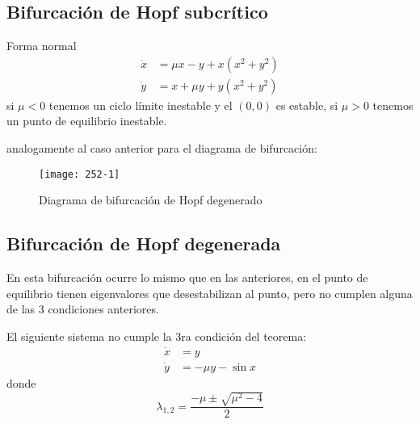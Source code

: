 \subsection{Bifurcación de Hopf subcrítico}
Forma normal
\begin{align*}
  \dot{x} &= \mu x - y + x(x^2 + y^2) \\
  \dot{y} &= x + \mu y + y(x^2+y^2) 
\end{align*}
si $\mu < 0$ tenemos un ciclo límite inestable y el $(0,0)$ es estable, si  $ \mu >0$ tenemos un punto de equilibrio inestable.
\begin{figure}[H]
 \centering
\end{figure}
analogamente al caso anterior para el diagrama de bifurcación:
\begin{figure}[H]
	\centering
	\texttt{[image: 252-1]}
	\caption{Diagrama de bifurcación de Hopf degenerado}
\end{figure}
\subsection{Bifurcación de Hopf degenerada}
En esta bifurcación ocurre lo mismo que en las anteriores, en el punto de equilibrio tienen eigenvalores que desestabilizan al punto, pero no cumplen alguna de las 3 condiciones anteriores. 
\begin{ejemplo}
	El siguiente sistema no cumple la 3ra condición del teorema:
	\begin{align*}
	  \dot{x} &= y \\
	  \dot{y} &= -\mu y - \sin x 
	\end{align*}
	donde  \begin{equation*}
	  \lambda_{1,2} = \frac{-\mu \pm \sqrt{\mu^2 -4}}{2}
	\end{equation*}

	\begin{figure}[H]
	 \centering
	  \subfloat[$\mu<0$]{
	    \texttt{[image: 3522-1]}}
	  \subfloat[$\mu=0$]{
	    \texttt{[image: 3522-2]}}
	  \subfloat[$\mu>0$]{
	    \texttt{[image: 3522-3]}}
	\end{figure}
\end{ejemplo}


